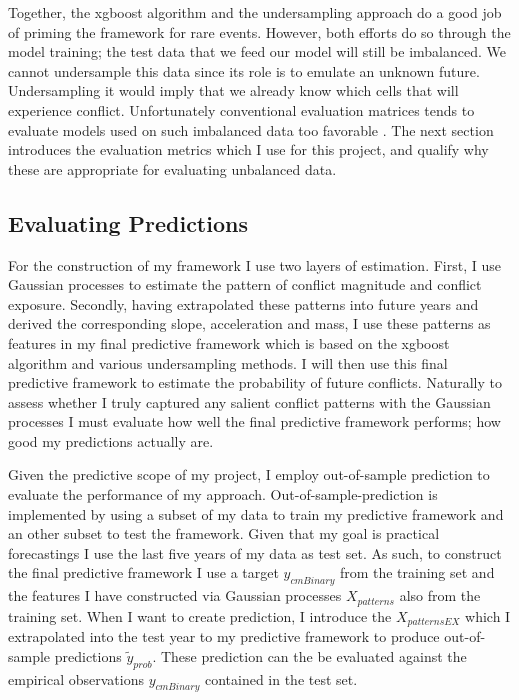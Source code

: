 \documentclass[a4paper]{article}
\begin{document}
Together, the xgboost algorithm and the undersampling approach do a good job of priming the framework for rare events. However, both efforts do so through the model training; the test data that we feed our model will still be imbalanced. We cannot undersample this data since its role is to emulate an unknown future. Undersampling it would imply that we already know which cells that will experience conflict. Unfortunately conventional evaluation matrices tends to evaluate models used on such imbalanced data too favorable \citep[1264]{He_2008}. The next section introduces the evaluation metrics which I use for this project, and qualify why these are appropriate for evaluating unbalanced data.\par


\subsection{Evaluating Predictions}

For the construction of my framework I use two layers of estimation. First, I use Gaussian processes to estimate the pattern of conflict magnitude and conflict exposure. Secondly, having extrapolated these patterns into future years and derived the corresponding slope, acceleration and mass, I use these patterns as features in my final predictive framework which is based on the xgboost algorithm and various undersampling methods. I will then use this final predictive framework to estimate the probability of future conflicts. Naturally to assess whether I truly captured any salient conflict patterns with the Gaussian processes I must evaluate how well the final predictive framework performs; how good my predictions actually are.\par

Given the predictive scope of my project, I employ out-of-sample prediction to evaluate the performance of my approach. Out-of-sample-prediction is implemented by using a subset of my data to train my predictive framework and an other subset to test the framework. Given that my goal is practical forecastings I use the last five years of my data as test set. As such, to construct the final predictive framework I use a target $y_{cmBinary}$ from the training set and the features I have constructed via Gaussian processes $X_{patterns}$ also from the training set. When I want to create prediction, I introduce the $X_{patternsEX}$ which I extrapolated into the test year to my predictive framework to produce out-of-sample predictions $\tilde{y}_{prob}$. These prediction can the be evaluated against the empirical observations $y_{cmBinary}$ contained in the test set.\par
\end{document}
